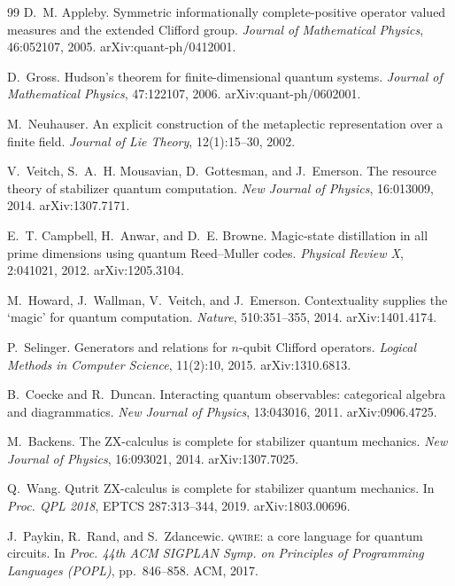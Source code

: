 \documentclass[sigplan,screen,review,anonymous]{acmart}
\begin{document}
\begin{thebibliography}{99}
D.~M. Appleby.
\newblock Symmetric informationally complete-positive operator valued measures
  and the extended Clifford group.
\newblock \emph{Journal of Mathematical Physics}, 46:052107, 2005.
\newblock arXiv:quant-ph/0412001.

D.~Gross.
\newblock Hudson's theorem for finite-dimensional quantum systems.
\newblock \emph{Journal of Mathematical Physics}, 47:122107, 2006.
\newblock arXiv:quant-ph/0602001.

M.~Neuhauser.
\newblock An explicit construction of the metaplectic representation over a
  finite field.
\newblock \emph{Journal of Lie Theory}, 12(1):15--30, 2002.

V.~Veitch, S.~A.~H. Mousavian, D.~Gottesman, and J.~Emerson.
\newblock The resource theory of stabilizer quantum computation.
\newblock \emph{New Journal of Physics}, 16:013009, 2014.
\newblock arXiv:1307.7171.

E.~T. Campbell, H.~Anwar, and D.~E. Browne.
\newblock Magic-state distillation in all prime dimensions using quantum
  Reed--Muller codes.
\newblock \emph{Physical Review X}, 2:041021, 2012.
\newblock arXiv:1205.3104.

M.~Howard, J.~Wallman, V.~Veitch, and J.~Emerson.
\newblock Contextuality supplies the `magic' for quantum computation.
\newblock \emph{Nature}, 510:351--355, 2014.
\newblock arXiv:1401.4174.

P.~Selinger.
\newblock Generators and relations for \(n\)-qubit Clifford operators.
\newblock \emph{Logical Methods in Computer Science}, 11(2):10, 2015.
\newblock arXiv:1310.6813.

B.~Coecke and R.~Duncan.
\newblock Interacting quantum observables: categorical algebra and
  diagrammatics.
\newblock \emph{New Journal of Physics}, 13:043016, 2011.
\newblock arXiv:0906.4725.

M.~Backens.
\newblock The ZX-calculus is complete for stabilizer quantum mechanics.
\newblock \emph{New Journal of Physics}, 16:093021, 2014.
\newblock arXiv:1307.7025.

Q.~Wang.
\newblock Qutrit ZX-calculus is complete for stabilizer quantum mechanics.
\newblock In \emph{Proc. QPL 2018}, EPTCS 287:313--344, 2019.
\newblock arXiv:1803.00696.

J.~Paykin, R.~Rand, and S.~Zdancewic.
\newblock \textsc{qwire}: a core language for quantum circuits.
\newblock In \emph{Proc. 44th ACM SIGPLAN Symp. on Principles of Programming
  Languages (POPL)}, pp.~846--858. ACM, 2017.


\end{thebibliography}
\end{document}
